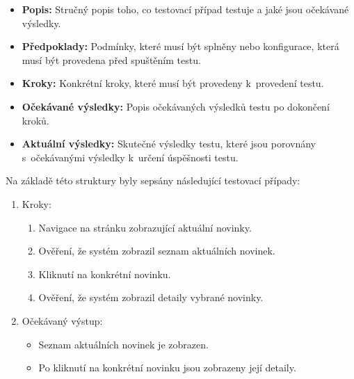 \begin{itemize}
  \item \textbf{Popis:} Stručný popis toho, co testovací případ testuje a jaké jsou očekávané výsledky.
  \item \textbf{Předpoklady:} Podmínky, které musí být splněny nebo konfigurace, která musí být provedena před spuštěním testu.
  \item \textbf{Kroky:} Konkrétní kroky, které musí být provedeny k~provedení testu.
  \item \textbf{Očekávané výsledky:} Popis očekávaných výsledků testu po dokončení kroků.
  \item \textbf{Aktuální výsledky:} Skutečné výsledky testu, které jsou porovnány s~očekávanými výsledky k~určení úspěšnosti testu.
\end{itemize}

Na základě této struktury byly sepsány následující testovací případy:



\begin{enumerate}
  \item Kroky:
    \begin{enumerate}
      \item Navigace na stránku zobrazující aktuální novinky.
      \item Ověření, že systém zobrazil seznam aktuálních novinek.
      \item Kliknutí na konkrétní novinku.
      \item Ověření, že systém zobrazil detaily vybrané novinky.
    \end{enumerate}
  \item Očekávaný výstup:
    \begin{itemize}
      \item Seznam aktuálních novinek je zobrazen.
      \item Po kliknutí na konkrétní novinku jsou zobrazeny její detaily.
    \end{itemize}
\end{enumerate}


